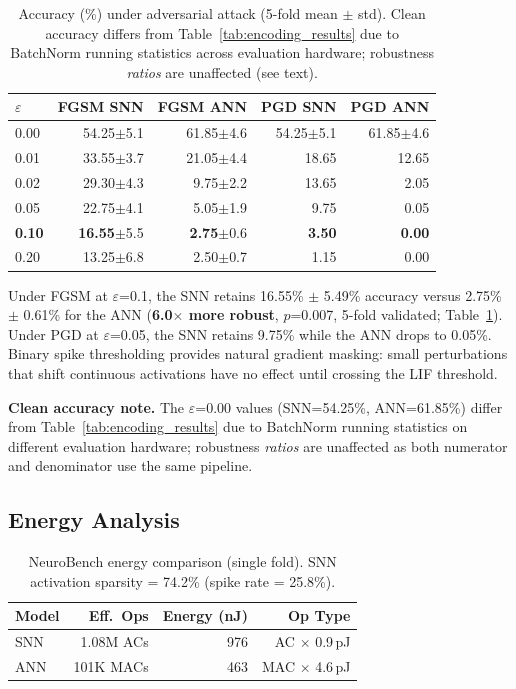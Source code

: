 \documentclass[sigconf,nonacm=false]{acmart}
\begin{document}
\begin{table}[t]
\caption{Accuracy (\%) under adversarial attack (5-fold mean $\pm$ std). Clean accuracy differs from Table~\ref{tab:encoding_results} due to BatchNorm running statistics across evaluation hardware; robustness \emph{ratios} are unaffected (see text).}
\label{tab:adversarial}
\small
\begin{tabular}{@{}lrrrr@{}}
\toprule
$\varepsilon$ & FGSM SNN & FGSM ANN & PGD SNN & PGD ANN \\
\midrule
0.00 & 54.25\tiny{$\pm$5.1} & 61.85\tiny{$\pm$4.6} & 54.25\tiny{$\pm$5.1} & 61.85\tiny{$\pm$4.6} \\
0.01 & 33.55\tiny{$\pm$3.7} & 21.05\tiny{$\pm$4.4} & 18.65 & 12.65 \\
0.02 & 29.30\tiny{$\pm$4.3} & 9.75\tiny{$\pm$2.2} & 13.65 & 2.05 \\
0.05 & 22.75\tiny{$\pm$4.1} & 5.05\tiny{$\pm$1.9} & 9.75 & 0.05 \\
\textbf{0.10} & \textbf{16.55}\tiny{$\pm$5.5} & \textbf{2.75}\tiny{$\pm$0.6} & \textbf{3.50} & \textbf{0.00} \\
0.20 & 13.25\tiny{$\pm$6.8} & 2.50\tiny{$\pm$0.7} & 1.15 & 0.00 \\
\bottomrule
\end{tabular}
\end{table}

Under FGSM at $\varepsilon$=0.1, the SNN retains 16.55\% $\pm$ 5.49\% accuracy versus 2.75\% $\pm$ 0.61\% for the ANN (\textbf{6.0$\times$ more robust}, $p$=0.007, 5-fold validated; Table~\ref{tab:adversarial}). Under PGD at $\varepsilon$=0.05, the SNN retains 9.75\% while the ANN drops to 0.05\%. Binary spike thresholding provides natural gradient masking: small perturbations that shift continuous activations have no effect until crossing the LIF threshold.

\textbf{Clean accuracy note.} The $\varepsilon$=0.00 values (SNN=54.25\%, ANN=61.85\%) differ from Table~\ref{tab:encoding_results} due to BatchNorm running statistics on different evaluation hardware; robustness \emph{ratios} are unaffected as both numerator and denominator use the same pipeline.

\subsection{Energy Analysis}

\begin{table}[t]
\caption{NeuroBench energy comparison (single fold). SNN activation sparsity = 74.2\% (spike rate = 25.8\%).}
\label{tab:energy}
\small
\begin{tabular}{@{}lrrr@{}}
\toprule
Model & Eff.\ Ops & Energy (nJ) & Op Type \\
\midrule
SNN & 1.08M ACs & 976 & AC $\times$ 0.9\,pJ \\
ANN & 101K MACs & 463 & MAC $\times$ 4.6\,pJ \\
\bottomrule
\end{tabular}
\end{table}
\end{document}
